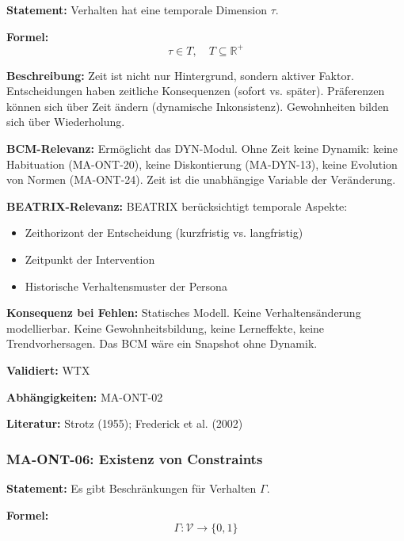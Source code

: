 \textbf{Statement:} Verhalten hat eine temporale Dimension $\tau$.

\textbf{Formel:}
\begin{equation}
\tau \in T, \quad T \subseteq \mathbb{R}^+
\end{equation}

\textbf{Beschreibung:}
Zeit ist nicht nur Hintergrund, sondern aktiver Faktor. Entscheidungen haben zeitliche Konsequenzen (sofort vs. später). Präferenzen können sich über Zeit ändern (dynamische Inkonsistenz). Gewohnheiten bilden sich über Wiederholung.

\textbf{BCM-Relevanz:}
Ermöglicht das DYN-Modul. Ohne Zeit keine Dynamik: keine Habituation (MA-ONT-20), keine Diskontierung (MA-DYN-13), keine Evolution von Normen (MA-ONT-24). Zeit ist die unabhängige Variable der Veränderung.

\textbf{BEATRIX-Relevanz:}
BEATRIX berücksichtigt temporale Aspekte:
\begin{itemize}
    \item Zeithorizont der Entscheidung (kurzfristig vs. langfristig)
    \item Zeitpunkt der Intervention
    \item Historische Verhaltensmuster der Persona
\end{itemize}

\textbf{Konsequenz bei Fehlen:}
Statisches Modell. Keine Verhaltensänderung modellierbar. Keine Gewohnheitsbildung, keine Lerneffekte, keine Trendvorhersagen. Das BCM wäre ein Snapshot ohne Dynamik.

\textbf{Validiert:} WTX

\textbf{Abhängigkeiten:} MA-ONT-02

\textbf{Literatur:} Strotz (1955); Frederick et al. (2002)


\subsubsection*{MA-ONT-06: Existenz von Constraints}

\textbf{Statement:} Es gibt Beschränkungen für Verhalten $\Gamma$.

\textbf{Formel:}
\begin{equation}
\Gamma: \mathcal{V} \rightarrow \{0, 1\}
\end{equation}


